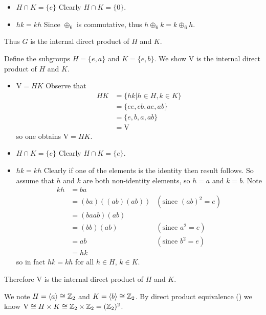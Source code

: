 \begin{questions}
\begin{itemize}
        \item $\boxed{H \cap K = \{e\}}$ Clearly $H \cap K = \{0\}$.

        \item $\boxed{hk = kh}$ Since $\oplus_6$ is commutative, thus $h \oplus_6 k = k \oplus_6 h$.
    \end{itemize}
    Thus $G$ is the internal direct product of $H$ and $K$.

    \item Define the subgroups $H = \{e, a\}$ and $K = \{e, b\}$. We show $\mathrm{V}$ is the internal direct product of $H$ and $K$.
    \begin{itemize}
        \item $\boxed{\mathrm{V} = HK}$ Observe that
        \begin{align*}
            HK &= \{hk \vert h \in H, k \in K\}\\
            &= \{ee, eb, ae, ab\}\\
            &= \{e, b, a, ab\}\\
            &= \mathrm{V}
        \end{align*}
        so one obtains $\mathrm{V} = HK$.

        \item $\boxed{H \cap K = \{e\}}$ Clearly $H \cap K = \{e\}$.

        \item $\boxed{hk = kh}$ Clearly if one of the elements is the identity then result follows. So assume that $h$ and $k$ are both non-identity elements, so $h = a$ and $k = b$. Note
        \begin{align*}
            kh &= ba\\
            &= (ba)\left((ab)(ab)\right) & (\text{since }(ab)^2 = e)\\
            &= (ba ab)(ab)\\
            &= (bb)(ab) & (\text{since }a^2 = e)\\
            &= ab & (\text{since }b^2 = e)\\
            &= hk
        \end{align*}
        so in fact $hk = kh$ for all $h \in H$, $k \in K$.
    \end{itemize}
    Therefore $\mathrm{V}$ is the internal direct product of $H$ and $K$.

    We note $H = \langle a\rangle \cong \mathbb{Z}_2$ and $K = \langle b \rangle \cong \mathbb{Z}_2$. By direct product equivalence () we know $\mathrm{V} \cong H \times K \cong \mathbb{Z}_2 \times \mathbb{Z}_2 = (\mathbb{Z}_2)^2$.
\end{questions}
